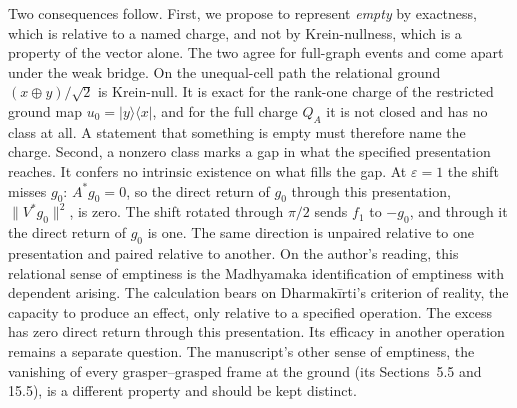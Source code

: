 \documentclass[11pt]{article}
\theoremstyle{remark}
\newcommand{\ket}[1]{\lvert #1\rangle}
\newcommand{\bra}[1]{\langle #1\rvert}
\begin{document}
Two consequences follow. First, we propose to represent \emph{empty} by exactness, which is relative to a named charge, and not by Krein-nullness, which is a property of the vector alone. The two agree for full-graph events and come apart under the weak bridge. On the unequal-cell path the relational ground $(x\oplus y)/\sqrt2$ is Krein-null. It is exact for the rank-one charge of the restricted ground map $u_0=\ket y\!\bra x$, and for the full charge $Q_A$ it is not closed and has no class at all. A statement that something is empty must therefore name the charge. Second, a nonzero class marks a gap in what the specified presentation reaches. It confers no intrinsic existence on what fills the gap. At $\varepsilon=1$ the shift misses $g_0$: $A^*g_0=0$, so the direct return of $g_0$ through this presentation, $\|V^*g_0\|^2$, is zero. The shift rotated through $\pi/2$ sends $f_1$ to $-g_0$, and through it the direct return of $g_0$ is one. The same direction is unpaired relative to one presentation and paired relative to another. On the author's reading, this relational sense of emptiness is the Madhyamaka identification of emptiness with dependent arising. The calculation bears on Dharmak\=irti's criterion of reality, the capacity to produce an effect, only relative to a specified operation. The excess has zero direct return through this presentation. Its efficacy in another operation remains a separate question. The manuscript's other sense of emptiness, the vanishing of every grasper--grasped frame at the ground (its Sections~5.5 and 15.5), is a different property and should be kept distinct.
\end{document}
